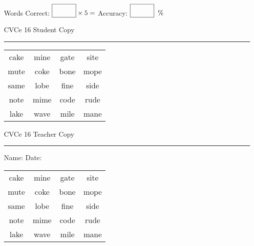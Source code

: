 \documentclass{memoir}
\begin{document}
\small

Words Correct: $\fbox{\phantom{\huge 100}} \times 5 = $ Accuracy: $\fbox{\phantom{\huge 100}}\;\; \%$ 

\vfill

\newpage


\footnotesize \noindent
CVCe 16 \hfill Student Copy
\smallskip
\hrule

\Large

\setlength{\tabcolsep}{14pt}
\def\arraystretch{2}

{\selectfont


\begin{vplace}[0.5]
\begin{center}
\begin{tabular}{cccc}
cake & mine & gate & site \\
mute & coke & bone & mope \\
same & lobe & fine & side \\
note & mime & code & rude \\
lake & wave & mile & mane \\
\end{tabular}
\end{center}
\end{vplace}

}

\newpage

\footnotesize \noindent
CVCe 16 \hfill Teacher Copy
\smallskip
\hrule

\small

\vfill

\noindent
Name: \underline{\hspace{1.75in}} \hfill Date: \underline{\hspace{1in}}

\Large

{\selectfont


\begin{vplace}[0.5]
\begin{center}
\begin{tabular}{cccc}
cake & mine & gate & site \\
mute & coke & bone & mope \\
same & lobe & fine & side \\
note & mime & code & rude \\
lake & wave & mile & mane \\
\end{tabular}
\end{center}
\end{vplace}



}
\end{document}
